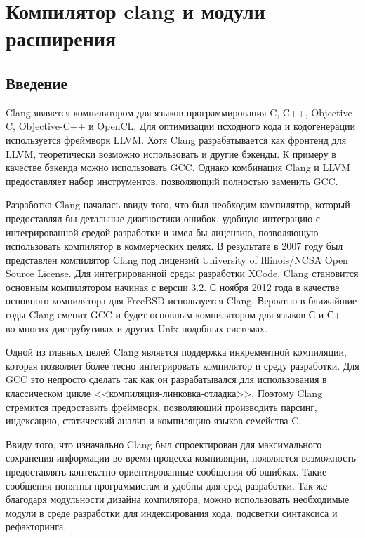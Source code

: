\chapter{Компилятор clang и модули расширения}

\section{Введение}
Clang\cite{clang} является компилятором для языков программирования C, C++, Objective-C, Objective-C++ и OpenCL.
Для оптимизации исходного кода и кодогенерации используется фреймворк LLVM\cite{llvm}. Хотя Clang разрабатывается
как фронтенд для LLVM, теоретически возможно использовать и другие бэкенды. К примеру в качестве бэкенда
можно использовать GCC. Однако комбинация Clang и LLVM предоставляет набор инструментов, 
позволяющий полностью заменить GCC. 

Разработка Clang началась ввиду того, что был необходим компилятор, который предоставлял бы 
детальные диагностики ошибок, удобную интеграцию с интегрированной средой разработки и имел бы
лицензию, позволяющую использовать компилятор в коммерческих целях. В результате в 2007 году был 
представлен компилятор Clang под лицензий University of Illinois/NCSA Open Source License.
Для интегрированной среды разработки XCode, Clang становится основным компилятором начиная с версии 3.2.
С ноября 2012 года в качестве основного компилятора для FreeBSD используется Clang. Вероятно в ближайшие годы
Clang сменит GCC и будет основным компилятором для языков С и С++ во многих диструбутивах и
других Unix-подобных системах.

Одной из главных целей Clang является поддержка инкрементной компиляции, которая позволяет более
тесно интегрировать компилятор и среду разработки. Для GCC это непросто 
сделать так как он разрабатывался для использования в классическом цикле <<компиляция-линковка-отладка>>.
Поэтому Clang стремится предоставить фреймворк, позволяющий производить парсинг, индексацию, 
статический анализ и компиляцию языков семейства C. 

Ввиду того, что изначально Clang был спроектирован для максимального сохранения информации во время 
процесса компиляции, появляется возможность предоставлять контекстно-ориентированные сообщения об ошибках.
Такие сообщения понятны программистам и удобны для сред разработки. Так же благодаря 
модульности дизайна компилятора, можно использовать необходимые модули в среде разработки для
индексирования кода, подсветки синтаксиса и рефакторинга.

